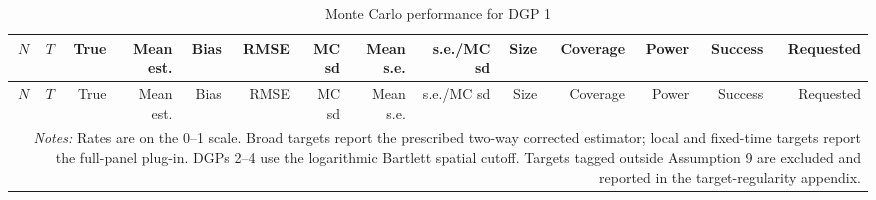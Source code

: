 \begingroup
\small
\begin{longtable}{rrrrrrrrrrrrrr}
\caption{Monte Carlo performance for DGP 1}\label{tab:mc-dgp1}\\
\toprule
$N$ & $T$ & True & Mean est. & Bias & RMSE & MC sd & Mean s.e. & s.e./MC sd & Size & Coverage & Power & Success & Requested \\
\midrule
\endfirsthead
\toprule
$N$ & $T$ & True & Mean est. & Bias & RMSE & MC sd & Mean s.e. & s.e./MC sd & Size & Coverage & Power & Success & Requested \\
\midrule
\endhead
\bottomrule
\multicolumn{14}{p{0.96\linewidth}}{\footnotesize \textit{Notes:} Rates are on the 0--1 scale. Broad targets report the prescribed two-way corrected estimator; local and fixed-time targets report the full-panel plug-in. DGPs 2--4 use the logarithmic Bartlett spatial cutoff. Targets tagged outside Assumption 9 are excluded and reported in the target-regularity appendix.} \\
\end{longtable}
\endgroup
